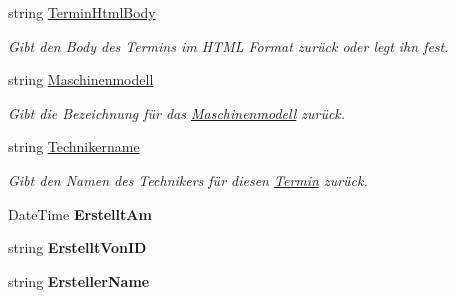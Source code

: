 \begin{DoxyCompactItemize}
string \hyperlink{class_products_1_1_model_1_1_entities_1_1_servicetermin_a4a7dca909a09e0996d693db9cd11aade}{Termin\+Html\+Body}
\begin{DoxyCompactList}\small\item\em Gibt den Body des Termins im H\+T\+ML Format zurück oder legt ihn fest. \end{DoxyCompactList}\item 
string \hyperlink{class_products_1_1_model_1_1_entities_1_1_servicetermin_aaa083b061700e5889cc19c342110ce8d}{Maschinenmodell}
\begin{DoxyCompactList}\small\item\em Gibt die Bezeichnung für das \hyperlink{class_products_1_1_model_1_1_entities_1_1_maschinenmodell}{Maschinenmodell} zurück. \end{DoxyCompactList}\item 
string \hyperlink{class_products_1_1_model_1_1_entities_1_1_servicetermin_a5e1b45561a89e8e0ab884b7ce2be39e0}{Technikername}
\begin{DoxyCompactList}\small\item\em Gibt den Namen des Technikers für diesen \hyperlink{class_products_1_1_model_1_1_entities_1_1_termin}{Termin} zurück. \end{DoxyCompactList}\item 
Date\+Time {\bfseries Erstellt\+Am}\hypertarget{class_products_1_1_model_1_1_entities_1_1_servicetermin_a8f3a3a1c7e643b32847b4cddefc84d22}{}\label{class_products_1_1_model_1_1_entities_1_1_servicetermin_a8f3a3a1c7e643b32847b4cddefc84d22}

\item 
string {\bfseries Erstellt\+Von\+ID}\hypertarget{class_products_1_1_model_1_1_entities_1_1_servicetermin_ae5557d12aff8b192d9eb95ebb6f324da}{}\label{class_products_1_1_model_1_1_entities_1_1_servicetermin_ae5557d12aff8b192d9eb95ebb6f324da}

\item 
string {\bfseries Ersteller\+Name}\hypertarget{class_products_1_1_model_1_1_entities_1_1_servicetermin_a6aeb2e79dcf1502b42827fc4137fcac0}{}\label{class_products_1_1_model_1_1_entities_1_1_servicetermin_a6aeb2e79dcf1502b42827fc4137fcac0}


\end{DoxyCompactItemize}
